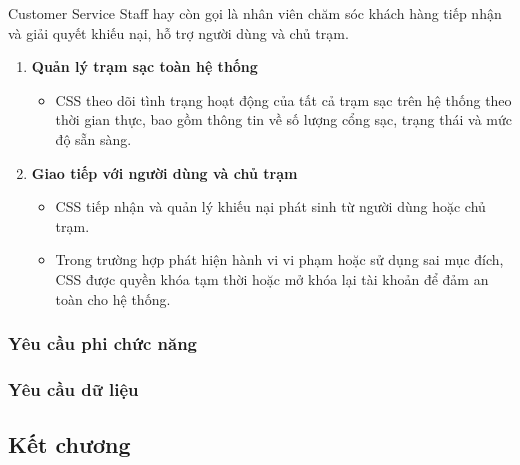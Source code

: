 Customer Service Staff hay còn gọi là nhân viên chăm sóc khách hàng tiếp nhận và giải quyết khiếu nại, hỗ trợ người dùng và chủ trạm.
\begin{enumerate}[label=\textbf{\alph*)}]
 \item \textbf{Quản lý trạm sạc toàn hệ thống}
 \begin{itemize}
    \item CSS theo dõi tình trạng hoạt động của tất cả trạm sạc trên hệ thống theo thời gian thực, bao gồm thông tin về số lượng cổng sạc, trạng thái và mức độ sẵn sàng.
 \end{itemize}
 \item \textbf{Giao tiếp với người dùng và chủ trạm}
 \begin{itemize}
    \item CSS tiếp nhận và quản lý khiếu nại phát sinh từ người dùng hoặc chủ trạm.
   \item Trong trường hợp phát hiện hành vi vi phạm hoặc sử dụng sai mục đích, CSS được quyền khóa tạm thời hoặc mở khóa lại tài khoản để đảm an toàn cho hệ thống.
 \end{itemize}
 \end{enumerate}
\subsubsection{Yêu cầu phi chức năng}
\subsubsection{Yêu cầu dữ liệu}

\subsection{Kết chương}